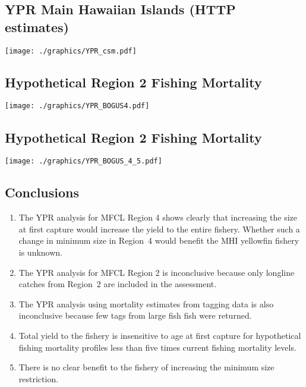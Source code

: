 \documentclass[a4paper,KOMA,landscape,titlepage]{powersem}
\begin{document}
\begin{slide}\section{YPR Main Hawaiian Islands (HTTP estimates)}
\begin{center}
\texttt{[image: ./graphics/YPR\_csm.pdf]}
\end{center}
\end{slide}

\begin{slide}\section{Hypothetical Region 2 Fishing Mortality}
\begin{center}
\texttt{[image: ./graphics/YPR\_BOGUS4.pdf]}
\end{center}
\end{slide}

\begin{slide}\section{Hypothetical Region 2 Fishing Mortality}
\begin{center}
\texttt{[image: ./graphics/YPR\_BOGUS\_4\_5.pdf]}
\end{center}
\end{slide}

\begin{slide}\section{Conclusions}
\begin{enumerate}
\item The YPR analysis for MFCL Region 4 shows clearly that increasing
the size at first capture would increase the yield to the entire fishery.
Whether such a change in minimum size in Region~4 would
benefit the MHI yellowfin fishery is unknown.

\item The YPR analysis for MFCL Region 2 is inconclusive because only
longline catches from Region~2 are included in the assessment.

\item The YPR analysis using mortality estimates from tagging data is
also inconclusive because few tags from large fish fish were returned.

\item Total yield to the fishery is insensitive to age at first
capture for hypothetical fishing mortality profiles less than five
times current fishing mortality levels.

\item There is no clear benefit to the fishery of increasing the
minimum size restriction.
\end{enumerate}
\end{slide}
\end{document}
